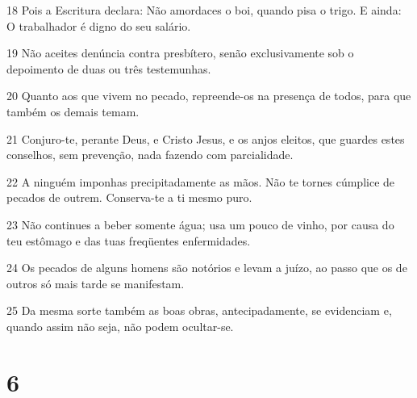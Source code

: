 \par 18 Pois a Escritura declara: Não amordaces o boi, quando pisa o trigo. E ainda: O trabalhador é digno do seu salário.
\par 19 Não aceites denúncia contra presbítero, senão exclusivamente sob o depoimento de duas ou três testemunhas.
\par 20 Quanto aos que vivem no pecado, repreende-os na presença de todos, para que também os demais temam.
\par 21 Conjuro-te, perante Deus, e Cristo Jesus, e os anjos eleitos, que guardes estes conselhos, sem prevenção, nada fazendo com parcialidade.
\par 22 A ninguém imponhas precipitadamente as mãos. Não te tornes cúmplice de pecados de outrem. Conserva-te a ti mesmo puro.
\par 23 Não continues a beber somente água; usa um pouco de vinho, por causa do teu estômago e das tuas freqüentes enfermidades.
\par 24 Os pecados de alguns homens são notórios e levam a juízo, ao passo que os de outros só mais tarde se manifestam.
\par 25 Da mesma sorte também as boas obras, antecipadamente, se evidenciam e, quando assim não seja, não podem ocultar-se.

\chapter{6}

